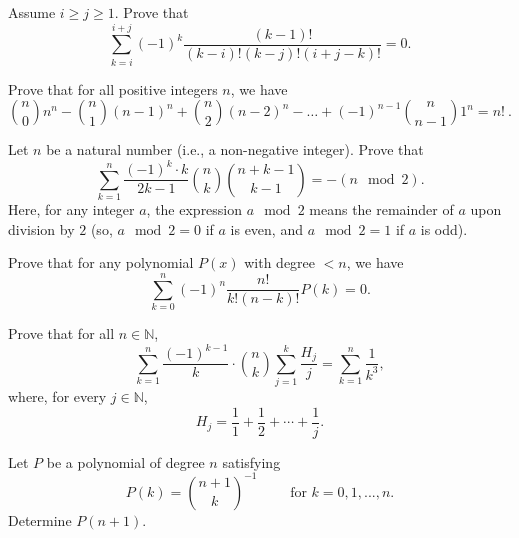 \documentclass[12pt,a4paper]{memoir}
\theoremstyle{definition}
\begin{document}
\begin{question}
	Assume $i\geq j\geq 1$. Prove that
	\[\sum_{k=i}^{i+j} (-1)^k\frac{(k-1)!}{(k-i)!(k-j)!(i+j-k)!}=0.\]
\end{question}



\begin{question}
	Prove that for all positive integers $n$, we have \[ \binom{n}{0} n^n - \binom{n}{1} (n-1)^n + \binom{n}{2} (n-2)^n - \ldots + (-1)^{n-1} \binom{n}{n-1} 1^n = n! \ .\]
\end{question}

\begin{question}
	Let $n$ be a natural number (i.e., a non-negative integer). Prove that \[\sum_{k = 1}^n \frac {\left( - 1\right)^k\cdot k}{2k - 1}\binom{n}{k}\binom{n + k - 1}{k - 1} = - \left(n\mod 2\right).\]
	Here, for any integer $a$, the expression $a \mod 2$ means the remainder of $a$ upon division by $2$ (so, $a \mod 2 = 0$ if $a$ is even, and $a \mod 2 = 1$ if $a$ is odd).
\end{question}


\begin{question}
	Prove that for any polynomial $ P\left(x\right)$ with degree $<n$, we have
	\[\sum_{k = 0}^{n} \left( - 1\right)^n \frac {n!}{k!\left(n - k\right)!}P\left(k\right) = 0.\]
\end{question}

\begin{question}[name={10490 AMM}]
	Prove that for all $ n\in\mathbb{N}$, 
	\[\sum_{k = 1}^{n}\frac {\left( - 1\right)^{k - 1}}{k}\cdot \binom{n}{k}\sum_{j = 1}^{k}\frac {H_{j}}{j} = \sum_{k = 1}^{n}\frac {1}{k^{3}},\]
	where, for every $ j\in\mathbb{N}$,
	\[H_{j} = \frac {1}{1} + \frac {1}{2} + \cdots + \frac {1}{j}.\]
\end{question}

\begin{question}
	Let $P$ be a polynomial of degree $n$ satisfying
	\[P(k) = \binom{n+1}{k}^{-1} \qquad \text{ for } k = 0, 1, . . ., n.\]
	Determine $P(n + 1).$
\end{question}
\end{document}
